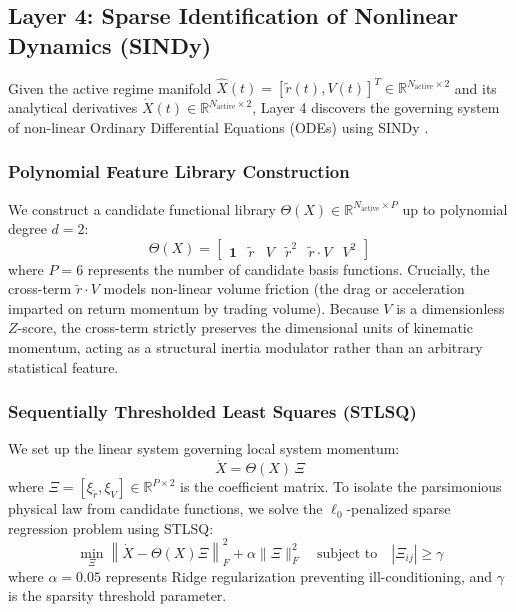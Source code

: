 \documentclass[11pt,a4paper]{article}
\begin{document}
\subsection{Layer 4: Sparse Identification of Nonlinear Dynamics (SINDy)}
\label{sec:layer4}

Given the active regime manifold $\hat{X}(t) = [\tilde{r}(t), V(t)]^T \in \mathbb{R}^{N_{\text{active}} \times 2}$ and its analytical derivatives $\dot{X}(t) \in \mathbb{R}^{N_{\text{active}} \times 2}$, Layer 4 discovers the governing system of non-linear Ordinary Differential Equations (ODEs) using SINDy \cite{brunton2016discovering, champion2019data}.

\subsubsection{Polynomial Feature Library Construction}
We construct a candidate functional library $\Theta(X) \in \mathbb{R}^{N_{\text{active}} \times P}$ up to polynomial degree $d = 2$:
\begin{equation}
    \Theta(X) = \begin{bmatrix} \mathbf{1} & \tilde{r} & V & \tilde{r}^2 & \tilde{r} \cdot V & V^2 \end{bmatrix}
\end{equation}
where $P = 6$ represents the number of candidate basis functions. Crucially, the cross-term $\tilde{r} \cdot V$ models non-linear volume friction (the drag or acceleration imparted on return momentum by trading volume). Because $V$ is a dimensionless $Z$-score, the cross-term strictly preserves the dimensional units of kinematic momentum, acting as a structural inertia modulator rather than an arbitrary statistical feature.

\subsubsection{Sequentially Thresholded Least Squares (STLSQ)}
We set up the linear system governing local system momentum:
\begin{equation}
    \dot{X} = \Theta(X) \, \Xi
\end{equation}
where $\Xi = [\xi_{\tilde{r}}, \xi_V] \in \mathbb{R}^{P \times 2}$ is the coefficient matrix. To isolate the parsimonious physical law from candidate functions, we solve the $\ell_0$-penalized sparse regression problem using STLSQ:
\begin{equation}
    \min_{\Xi} \left\| \dot{X} - \Theta(X)\Xi \right\|_F^2 + \alpha \|\Xi\|_F^2 \quad \text{subject to} \quad |\Xi_{ij}| \ge \gamma
\end{equation}
where $\alpha = 0.05$ represents Ridge regularization preventing ill-conditioning, and $\gamma$ is the sparsity threshold parameter.
\end{document}
